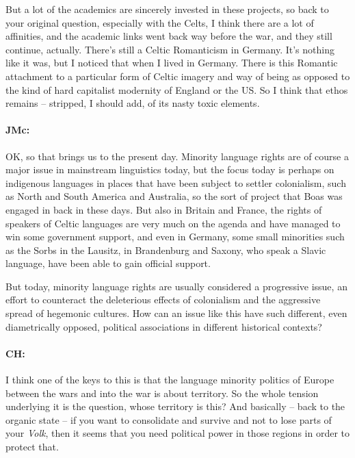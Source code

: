 \documentclass[output=paper]{langscibook}
\begin{document}
\largerpage

But a lot of the academics are sincerely invested in these projects, so back to your original question, especially with the Celts, I think there are a lot of affinities, and the academic links went back way before the war, and they still continue, actually. There’s still a Celtic Romanticism in Germany. It’s nothing like it was, but I noticed that when I lived in Germany. There is this Romantic attachment to a particular form of Celtic imagery and way of being as opposed to the kind of hard capitalist modernity of England or the US. So I think that ethos remains – stripped, I should add, of its nasty toxic elements.

\paragraph*{JMc:} OK, so that brings us to the present day. Minority language rights are of course a major issue in mainstream linguistics today, but the focus today is perhaps on indigenous languages in places that have been subject to settler colonialism, such as North and South America and Australia, so the sort of project that Boas was engaged in back in these days. But also in Britain and France, the rights of speakers of Celtic languages are very much on the agenda and have managed to win some government support, and even in Germany, some small minorities such as the Sorbs in the Lausitz, in Brandenburg and Saxony, who speak a Slavic language, have been able to gain official support.

But today, minority language rights are usually considered a progressive issue, an effort to counteract the deleterious effects of colonialism and the aggressive spread of hegemonic cultures. How can an issue like this have such different, even diametrically opposed, political associations in different historical contexts?

\paragraph*{CH:} I think one of the keys to this is that the language minority politics of Europe between the wars and into the war is about territory. So the whole tension underlying it is the question, whose territory is this? And basically – back to the organic state – if you want to consolidate and survive and not to lose parts of your \textit{Volk}, then it seems that you need political power in those regions in order to protect that.
\end{document}
